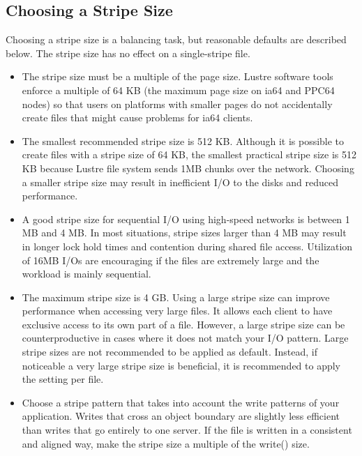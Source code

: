 \documentclass{article}
\begin{document}
\subsection{Choosing a Stripe Size}
Choosing a stripe size is a balancing task, but reasonable defaults are described below. The stripe size has no effect on a single-stripe file.

\begin{itemize}
    \item The stripe size must be a multiple of the page size. Lustre software tools enforce a multiple of 64 KB (the maximum page size on ia64 and PPC64 nodes) so that users on platforms with smaller pages do not accidentally create files that might cause problems for ia64 clients.

    \item The smallest recommended stripe size is 512 KB. Although it is possible to create files with a stripe size of 64 KB, the smallest practical stripe size is 512 KB because  Lustre file system sends 1MB chunks over the network. Choosing a smaller stripe size may result in inefficient I/O to the disks and reduced performance.

    \item A good stripe size for sequential I/O using high-speed networks is between 1 MB and 4 MB. In most situations, stripe sizes larger than 4 MB may result in longer lock hold times and contention during shared file access. Utilization of 16MB I/Os are encouraging if the files are extremely large and the workload is mainly sequential.

    \item The maximum stripe size is 4 GB. Using a large stripe size can improve performance when accessing very large files. It allows each client to have exclusive access to its own part of a file. However, a large stripe size can be counterproductive in cases where it does not match your I/O pattern. Large stripe sizes are not recommended to be applied as default. Instead, if noticeable a very large stripe size is beneficial, it is recommended to apply the setting per file.

    \item Choose a stripe pattern that takes into account the write patterns of your application. Writes that cross an object boundary are slightly less efficient than writes that go entirely to one server. If the file is written in a consistent and aligned way, make the stripe size a multiple of the write() size.

\end{itemize}
\end{document}
